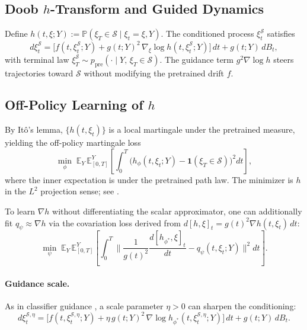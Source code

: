 \documentclass{article}
\newcommand{\E}{\mathbb{E}}
\newcommand{\Prob}{\mathbb{P}}
\newcommand{\1}{\mathbf{1}}
\newcommand{\cS}{\mathcal{S}}
\begin{document}
\subsection{Doob $h$-Transform and Guided Dynamics}

Define $h(t, \xi; Y) := \Prob(\xi_T \in \cS \mid \xi_t = \xi, Y)$. The conditioned process $\xi_t^\cS$ satisfies \citep{guo2026}
\begin{equation}
d\xi_t^\cS = \bigl[ f(t, \xi_t^\cS; Y) + g(t; Y)^2\, \nabla_\xi \log h(t, \xi_t^\cS; Y) \bigr]\, dt + g(t; Y)\, dB_t,
\label{eq:guided}
\end{equation}
with terminal law $\xi_T^\cS \sim p_{\text{pre}}(\cdot \mid Y,\, \xi_T \in \cS)$. The guidance term $g^2 \nabla \log h$ steers trajectories toward $\cS$ without modifying the pretrained drift $f$.

\subsection{Off-Policy Learning of $h$}

By Itô's lemma, $\{h(t, \xi_t)\}$ is a local martingale under the pretrained measure, yielding the off-policy martingale loss
\begin{equation}
\min_\phi\; \E_{Y}\, \E_{[0,T]}^Y\!\left[ \int_0^T \bigl( h_\phi(t, \xi_t; Y) - \1(\xi_T \in \cS) \bigr)^2 dt \right],
\label{eq:cdgml}
\end{equation}
where the inner expectation is under the pretrained path law. The minimizer is $h$ in the $L^2$ projection sense; see \citet[Section 3.2.1]{guo2026}.

To learn $\nabla h$ without differentiating the scalar approximator, one can additionally fit $q_\psi \approx \nabla h$ via the covariation loss derived from $d[h, \xi]_t = g(t)^2 \nabla h(t, \xi_t)\, dt$:
\begin{equation}
\min_\psi\; \E_Y\, \E_{[0,T]}^Y\!\left[ \int_0^T \biggl\| \frac{1}{g(t)^2} \frac{d[h_{\phi^*}, \xi]_t}{dt} - q_\psi(t, \xi_t; Y) \biggr\|^2 dt \right].
\label{eq:cdgmcl}
\end{equation}

\paragraph{Guidance scale.} As in classifier guidance \citep{dhariwal2021,ho2021,wu2024}, a scale parameter $\eta > 0$ can sharpen the conditioning:
\begin{equation}
d\xi_t^{\cS,\eta} = \bigl[ f(t, \xi_t^{\cS,\eta}; Y) + \eta\, g(t; Y)^2\, \nabla \log h_{\phi^*}(t, \xi_t^{\cS,\eta}; Y) \bigr]\, dt + g(t; Y)\, dB_t.
\end{equation}
\end{document}
